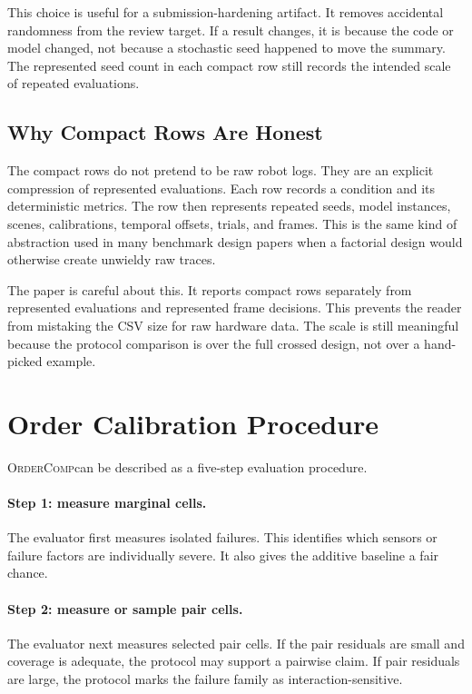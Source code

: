 \documentclass{article}
\newcommand{\method}{\textsc{OrderComp}}
\begin{document}
This choice is useful for a submission-hardening artifact. It removes accidental randomness from the review target. If a result changes, it is because the code or model changed, not because a stochastic seed happened to move the summary. The represented seed count in each compact row still records the intended scale of repeated evaluations.

\subsection{Why Compact Rows Are Honest}

The compact rows do not pretend to be raw robot logs. They are an explicit compression of represented evaluations. Each row records a condition and its deterministic metrics. The row then represents repeated seeds, model instances, scenes, calibrations, temporal offsets, trials, and frames. This is the same kind of abstraction used in many benchmark design papers when a factorial design would otherwise create unwieldy raw traces.

The paper is careful about this. It reports compact rows separately from represented evaluations and represented frame decisions. This prevents the reader from mistaking the CSV size for raw hardware data. The scale is still meaningful because the protocol comparison is over the full crossed design, not over a hand-picked example.

\section{Order Calibration Procedure}

\method can be described as a five-step evaluation procedure.

\paragraph{Step 1: measure marginal cells.}
The evaluator first measures isolated failures. This identifies which sensors or failure factors are individually severe. It also gives the additive baseline a fair chance.

\paragraph{Step 2: measure or sample pair cells.}
The evaluator next measures selected pair cells. If the pair residuals are small and coverage is adequate, the protocol may support a pairwise claim. If pair residuals are large, the protocol marks the failure family as interaction-sensitive.
\end{document}
